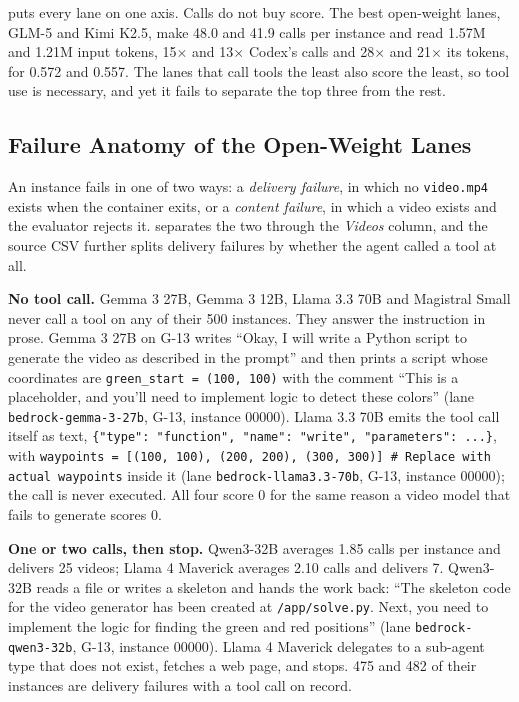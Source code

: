  puts every lane on one axis. Calls do not buy score. The best open-weight lanes, GLM-5 and Kimi K2.5, make 48.0 and 41.9 calls per instance and read 1.57M and 1.21M input tokens, 15$\times$ and 13$\times$ Codex's calls and 28$\times$ and 21$\times$ its tokens, for 0.572 and 0.557. The lanes that call tools the least also score the least, so tool use is necessary, and yet it fails to separate the top three from the rest.



\subsection{Failure Anatomy of the Open-Weight Lanes}
\label{sec:ana-failure}

An instance fails in one of two ways: a \emph{delivery failure}, in which no \texttt{video.mp4} exists when the container exits, or a \emph{content failure}, in which a video exists and the evaluator rejects it.  separates the two through the \emph{Videos} column, and the source CSV further splits delivery failures by whether the agent called a tool at all.

\textbf{No tool call.} Gemma 3 27B, Gemma 3 12B, Llama 3.3 70B and Magistral Small never call a tool on any of their 500 instances. They answer the instruction in prose. Gemma 3 27B on G-13 writes ``Okay, I will write a Python script to generate the video as described in the prompt'' and then prints a script whose coordinates are \texttt{green\_start = (100, 100)} with the comment ``This is a placeholder, and you'll need to implement logic to detect these colors'' (lane \texttt{bedrock-gemma-3-27b}, G-13, instance 00000). Llama 3.3 70B emits the tool call itself as text, \texttt{\{"type": "function", "name": "write", "parameters": ...\}}, with \texttt{waypoints = [(100, 100), (200, 200), (300, 300)]  \# Replace with actual waypoints} inside it (lane \texttt{bedrock-llama3.3-70b}, G-13, instance 00000); the call is never executed. All four score 0 for the same reason a video model that fails to generate scores 0.

\textbf{One or two calls, then stop.} Qwen3-32B averages 1.85 calls per instance and delivers 25 videos; Llama 4 Maverick averages 2.10 calls and delivers 7. Qwen3-32B reads a file or writes a skeleton and hands the work back: ``The skeleton code for the video generator has been created at \texttt{/app/solve.py}. Next, you need to implement the logic for finding the green and red positions'' (lane \texttt{bedrock-qwen3-32b}, G-13, instance 00000). Llama 4 Maverick delegates to a sub-agent type that does not exist, fetches a web page, and stops. 475 and 482 of their instances are delivery failures with a tool call on record.

